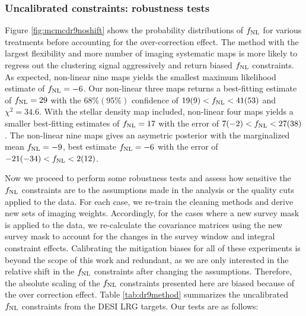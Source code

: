 \subsubsection{Uncalibrated constraints: robustness tests}
Figure \ref{fig:mcmcdr9noshift} shows the probability distributions of $f_{\rm NL}$ for various treatments before accounting for the over-correction effect. The method with the largest flexibility and more number of imaging systematic maps is more likely to regress out the clustering signal aggressively and return biased $f_{\rm NL}$ constraints. As expected, non-linear nine maps yields the smallest maximum likelihood estimate of $f_{\rm NL}=-6$. Our non-linear three maps returns a best-fitting estimate of $f_{\rm NL}=29$ with the $68\%(95\%)$ confidence of $19(9)<f_{\rm NL} <41(53)$ and $\chi^{2}=34.6$. With the stellar density map included, non-linear four maps yields a smaller best-fitting estimates of $f_{\rm NL}=17$ with the error of $7(-2)<f_{\rm NL}<27(38)$. The non-linear nine maps gives an asymetric posterior with the marginalized mean $f_{\rm NL}=-9$, best estimate $f_{\rm NL}=-6$ with the error of $-21(-34)<f_{\rm NL}<2(12)$.

Now we proceed to perform some robustness tests and assess how sensitive the $f_{\rm NL}$ constraints are to the assumptions made in the analysis or the quality cuts applied to the data. For each case, we re-train the cleaning methods and derive new sets of imaging weights. Accordingly, for the cases where a new survey mask is applied to the data, we re-calculate the covariance matrices using the new survey mask to account for the changes in the survey window and integral constraint effects. Calibrating the mitigation biases for all of these experiments is beyond the scope of this work and redundant, as we are only interested in the relative shift in the $f_{\rm NL}$ constraints after changing the assumptions. Therefore, the absolute scaling of the $f_{\rm NL}$ constraints presented here are biased because of the over correction effect. Table \ref{tab:dr9method} summarizes the uncalibrated $f_{\rm NL}$ constraints from the DESI LRG targets. Our tests are as follows:%

